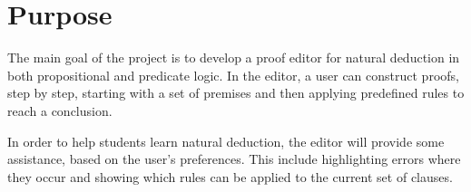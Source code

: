 \section{Purpose}
The main goal of the project is to develop a proof editor for natural deduction in both propositional and predicate logic. In the editor, a user can construct proofs, step by step, starting with a set of premises and then applying predefined rules to reach a conclusion.

In order to help students learn natural deduction, the editor will provide some assistance, based on the user's preferences. This include highlighting errors where they occur and showing which rules can be applied to the current set of clauses.